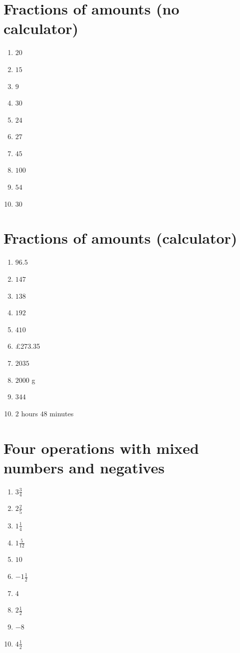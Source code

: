 \documentclass{article}
\begin{document}
\section*{Fractions of amounts (no calculator)}
\begin{enumerate}
    \item $20$
    \item $15$
    \item $9$
    \item $30$
    \item $24$
    \item $27$
    \item $45$
    \item $100$
    \item $54$
    \item $30$
\end{enumerate}

\section*{Fractions of amounts (calculator)}
\begin{enumerate}
    \item $96.5$
    \item $147$
    \item $138$
    \item $192$
    \item $410$
    \item \pounds273.35
    \item $2035$
    \item $2000$ g
    \item $344$
    \item $2$ hours $48$ minutes
\end{enumerate}

\section*{Four operations with mixed numbers and negatives}
\begin{enumerate}
    \item $3\frac34$
    \item $2\frac25$
    \item $1\frac14$
    \item $1\frac{5}{12}$
    \item $10$
    \item $-1\frac12$
    \item $4$
    \item $2\frac12$
    \item $-8$
    \item $4\frac12$
\end{enumerate}
\end{document}
